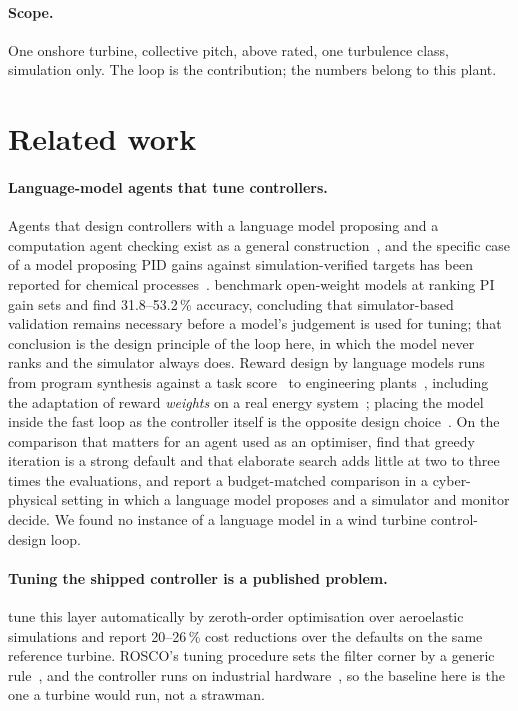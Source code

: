 \documentclass{article}
\begin{document}
\paragraph{Scope.} One onshore turbine, collective pitch, above rated, one turbulence class, simulation only. The loop is the contribution; the numbers belong to this plant.

\section{Related work}
\label{sec:related}

\paragraph{Language-model agents that tune controllers.} Agents that design controllers with a language model proposing and a computation agent checking exist as a general construction~\citep{Guo2024controlagent}, and the specific case of a model proposing PID gains against simulation-verified targets has been reported for chemical processes~\citep{Shou2026pidllm}. \citet{Chen2026llmranking} benchmark open-weight models at ranking PI gain sets and find 31.8--53.2\,\% accuracy, concluding that simulator-based validation remains necessary before a model's judgement is used for tuning; that conclusion is the design principle of the loop here, in which the model never ranks and the simulator always does. Reward design by language models runs from program synthesis against a task score~\citep{Ma2024eureka,Yu2023l2r,Xie2024text2reward,Ma2024dreureka,Lee2026rda,Gao2026rfagent} to engineering plants~\citep{Cardenoso2025learnopt,Casas2026large}, including the adaptation of reward \emph{weights} on a real energy system~\citep{Wu2026llmrewardweight}; placing the model inside the fast loop as the controller itself is the opposite design choice~\citep{Rasheed2025llmcontrol}. On the comparison that matters for an agent used as an optimiser, \citet{Li2026greedy} find that greedy iteration is a strong default and that elaborate search adds little at two to three times the evaluations, and \citet{Bigdeli2026falsifiers} report a budget-matched comparison in a cyber-physical setting in which a language model proposes and a simulator and monitor decide. We found no instance of a language model in a wind turbine control-design loop.

\paragraph{Tuning the shipped controller is a published problem.} \citet{Zalkind2020tuning} tune this layer automatically by zeroth-order optimisation over aeroelastic simulations and report 20--26\,\% cost reductions over the defaults on the same reference turbine. ROSCO's tuning procedure sets the filter corner by a generic rule~\citep{Abbas2022rosco}, and the controller runs on industrial hardware~\citep{Corredera2026plc}, so the baseline here is the one a turbine would run, not a strawman.
\end{document}
